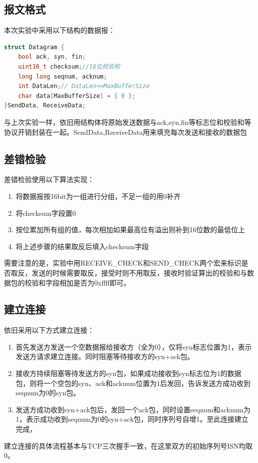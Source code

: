 \documentclass[UTF8,a4paper,10pt]{ctexart}
\begin{document}
\subsection{报文格式}
本次实验中采用以下结构的数据报：
\begin{lstlisting}[frame=trbl,language={C++}]
struct Datagram {
    bool ack, syn, fin;
    uint16_t checksum;//16位校验和
    long long seqnum, acknum;
    int DataLen;// DataLen<=MaxBufferSize
    char data[MaxBufferSize] = { 0 };
}SendData, ReceiveData;
\end{lstlisting}\par
与上次实验一样，依旧用结构体将原始发送数据与ack,syn,fin等标志位和校验和等协议开销封装在一起。SendData,ReceiveData用来填充每次发送和接收的数据包\par


\subsection{差错检验}
差错检验使用以下算法实现：
\begin{enumerate}
    \item 将数据报按16bit为一组进行分组，不足一组的用0补齐
    \item 将checksum字段置0
    \item 按位累加所有组的值，每次相加如果最高位有溢出则补到16位数的最低位上
    \item 将上述步骤的结果取反后填入checksum字段
\end{enumerate}\par
需要注意的是，实验中用RECEIVE\_CHECK和SEND\_CHECK两个宏来标识是否取反，发送的时候需要取反，接受时则不用取反，接收时验证算出的校验和与数据包的校验和字段相加是否为0xffff即可。

\subsection{建立连接}
依旧采用以下方式建立连接：
\begin{enumerate}
    \item 首先发送方发送一个空数据报给接收方（全为0），仅将syn标志位置为1，表示发送方请求建立连接。同时阻塞等待接收方的syn+ack包。
    \item 接收方持续阻塞等待发送方的syn包，如果成功接收到syn标志位为1的数据包，则将一个空包的syn、ack和acknum位置为1后发回，告诉发送方成功收到seqnum为0的syn包。
    \item 发送方成功收到syn+ack包后，发回一个ack包，同时设置seqnum和acknum为1，表示成功收到seqnum为0的syn+ack包，同时序列号自增1。至此连接建立完成，
\end{enumerate}\par
建立连接的具体流程基本与TCP三次握手一致，在这里双方的初始序列号ISN均取0。
\end{document}
